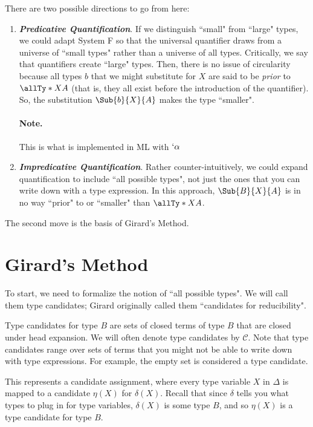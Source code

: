 \documentclass[letterpaper]{article}
\begin{document}
There are two possible directions to go from here:
\begin{enumerate}
    \item \textit{\textbf{Predicative Quantification}}. If we distinguish ``small" from ``large" types, we could adapt System F so that the universal quantifier draws from a universe of ``small types" rather than a universe of all types. Critically, we say that quantifiers create ``large" types. Then, there is no issue of circularity because all types $b$ that we might substitute for $X$ are said to be \textit{prior} to $\allTy*{X}{A}$ (that is, they all exist before the introduction of the quantifier). So, the substitution $\Sub{b}{X}{A}$ makes the type ``smaller". 
    \paragraph{Note.} This is what is implemented in ML with $`\alpha$
    \item \textit{\textbf{Impredicative Quantification}}. Rather counter-intuitively, we could expand quantification to include ``all possible types", not just the ones that you can write down with a type expression. In this approach, $\Sub{B}{X}{A}$ is in no way ``prior" to or ``smaller" than $\allTy*{X}{A}$.
\end{enumerate}
The second move is the basis of Girard's Method.

\section{Girard's Method}
To start, we need to formalize the notion of  ``all possible types". We will call them type candidates; Girard originally called them ``candidates for reducibility".

\begin{definition}
Type candidates for type $B$ are sets of closed terms of type $B$ that are closed under head expansion. We will often denote type candidates by $\mathcal{C}$. Note that type candidates range over sets of terms that you might not be able to write down with type expressions. For example, the empty set is considered a type candidate.
\end{definition}

\begin{definition}[$\eta \subseteq \delta : \Delta$]
This represents a candidate assignment, where every type variable $X$ in $\Delta$ is mapped to a candidate $\eta(X)$ for $\delta(X)$. Recall that since $\delta$ tells you what types to plug in for type variables, $\delta(X)$ is some type $B$, and so $\eta(X)$ is a type candidate for type $B$.
\end{definition}
\end{document}
